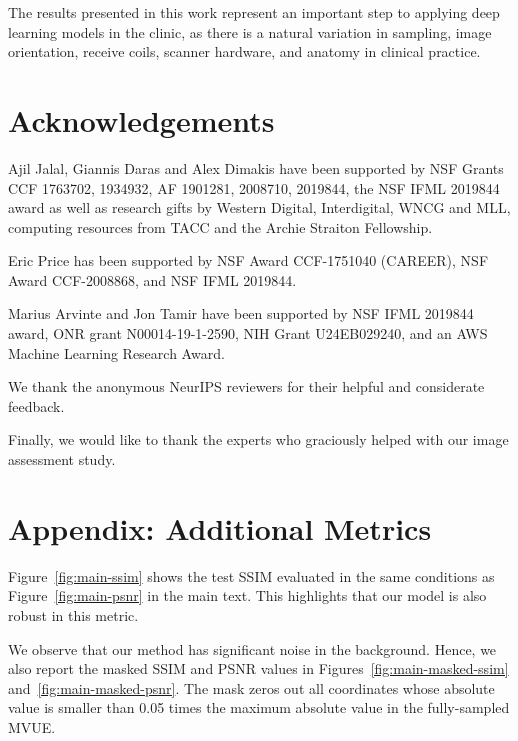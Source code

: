 The results presented in this work represent an important step to applying deep learning models in the clinic, as there is a natural variation in sampling, image orientation, receive coils, scanner hardware, and anatomy in clinical practice. 

\section{Acknowledgements} 
Ajil Jalal, Giannis Daras and Alex Dimakis have been supported by NSF Grants CCF 1763702, 1934932, AF 1901281, 2008710, 2019844, the NSF IFML 2019844 award as well as research gifts by Western Digital, Interdigital, WNCG and MLL, computing resources from TACC and the Archie Straiton Fellowship.

Eric Price has been supported by NSF Award CCF-1751040 (CAREER), NSF Award CCF-2008868, and NSF IFML 2019844.

Marius Arvinte and Jon Tamir have been supported by NSF IFML 2019844 award, ONR grant N00014-19-1-2590, NIH Grant U24EB029240, and an AWS Machine Learning Research Award.

We thank the anonymous NeurIPS reviewers for their helpful and considerate feedback.

Finally, we would like to thank the experts who graciously helped with our image assessment study.





\appendix

\section{Appendix: Additional Metrics}\label{app:metrics}
Figure~\ref{fig:main-ssim} shows the test SSIM evaluated in the same conditions as Figure~\ref{fig:main-psnr} in the main text. This highlights that our model is also robust in this metric.

We observe that our method has significant noise in the background. Hence, we also report the masked SSIM and PSNR values in Figures~\ref{fig:main-masked-ssim} and~\ref{fig:main-masked-psnr}. The mask zeros out all coordinates whose absolute value is smaller than 0.05 times the maximum absolute value in the fully-sampled MVUE.


